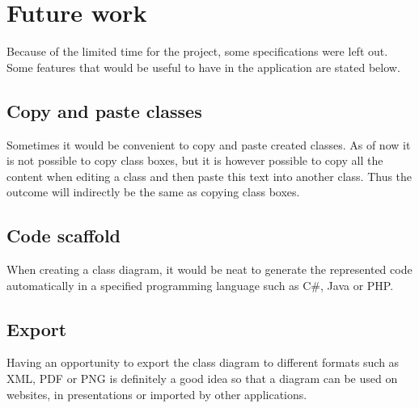 \section{Future work}
\label{sec:future_work}

Because of the limited time for the project, some specifications were left out. Some features that would be useful to have in the application are stated below.

\subsection{Copy and paste classes}

Sometimes it would be convenient to copy and paste created classes. As of now it is not possible to copy class boxes, but it is however possible to copy all the content when editing a class and then paste this text into another class. Thus the outcome will indirectly be the same as copying class boxes.

\subsection{Code scaffold}

When creating a class diagram, it would be neat to generate the represented code automatically in a specified programming language such as C\#, Java or PHP. 

\subsection{Export}

Having an opportunity to export the class diagram to different formats such as XML, PDF or PNG is definitely a good idea so that a diagram can be used on websites, in presentations or imported by other applications.